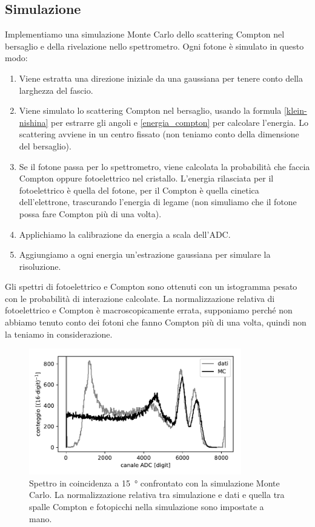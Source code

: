 \subsection{Simulazione}

Implementiamo una simulazione Monte Carlo dello scattering Compton nel bersaglio
e della rivelazione nello spettrometro.
Ogni fotone è simulato in questo modo:
\begin{enumerate}
	\item Viene estratta una direzione iniziale da una gaussiana per tenere conto della larghezza del fascio.
	\item Viene simulato lo scattering Compton nel bersaglio,
	usando la formula \eqref{klein-nishina} per estrarre gli angoli e \eqref{energia_compton} per calcolare l'energia.
	Lo scattering avviene in un centro fissato (non teniamo conto della dimensione del bersaglio).
	\item Se il fotone passa per lo spettrometro,
	viene calcolata la probabilità che faccia Compton oppure fotoelettrico nel cristallo.
	L'energia rilasciata per il fotoelettrico è quella del fotone,
	per il Compton è quella cinetica dell'elettrone, trascurando l'energia di legame
	(non simuliamo che il fotone possa fare Compton più di una volta).
	\item Applichiamo la calibrazione da energia a scala dell'ADC.
	\item Aggiungiamo a ogni energia un'estrazione gaussiana
	per simulare la risoluzione.
\end{enumerate}
Gli spettri di fotoelettrico e Compton sono ottenuti con un istogramma pesato con le probabilità di interazione calcolate.
La normalizzazione relativa di fotoelettrico e Compton è macroscopicamente errata,
supponiamo perché non abbiamo tenuto conto dei fotoni che fanno Compton più di una volta,
quindi non la teniamo in considerazione.

\begin{figure}
	\centering
	\includegraphics[width=25em]{sovrapposti}
	\caption{\label{fig:sovrapposti}
	Spettro in coincidenza a \SI{15}{\degree} confrontato con la simulazione Monte Carlo.
	La normalizzazione relativa tra simulazione e dati
	e quella tra spalle Compton e fotopicchi nella simulazione
	sono impostate a mano.}
\end{figure}
